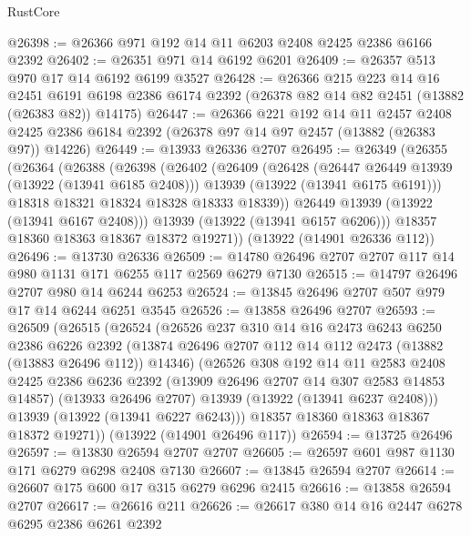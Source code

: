\begin{lexlean}{RustCore}
\begin{coremodule}
@26398 := @26366 @971 @192 @14 @11 @6203 @2408 @2425 @2386 @6166 @2392
@26402 := @26351 @971 @14 @6192 @6201
@26409 := @26357 @513 @970 @17 @14 @6192 @6199 @3527
@26428 := @26366
    @215
    @223
    @14
    @16
    @2451
    @6191
    @6198
    @2386
    @6174
    @2392
    (@26378 @82 @14 @82 @2451 (@13882 (@26383 @82)) @14175)
@26447 := @26366
    @221
    @192
    @14
    @11
    @2457
    @2408
    @2425
    @2386
    @6184
    @2392
    (@26378 @97 @14 @97 @2457 (@13882 (@26383 @97)) @14226)
@26449 := @13933 @26336 @2707
@26495 := @26349
    (@26355
      (@26364
        (@26388
          (@26398
            (@26402
              (@26409
                (@26428
                  (@26447 @26449 @13939 (@13922 (@13941 @6185 @2408)))
                  @13939
                  (@13922 (@13941 @6175 @6191)))
                @18318
                @18321
                @18324
                @18328
                @18333
                @18339))
            @26449
            @13939
            (@13922 (@13941 @6167 @2408)))
          @13939
          (@13922 (@13941 @6157 @6206)))
        @18357
        @18360
        @18363
        @18367
        @18372
        @19271))
    (@13922 (@14901 @26336 @112))
@26496 := @13730 @26336
@26509 := @14780 @26496 @2707 @2707 @117 @14 @980 @1131 @171 @6255 @117 @2569 @6279 @7130
@26515 := @14797 @26496 @2707 @980 @14 @6244 @6253
@26524 := @13845 @26496 @2707 @507 @979 @17 @14 @6244 @6251 @3545
@26526 := @13858 @26496 @2707
@26593 := @26509
    (@26515
      (@26524
        (@26526
          @237
          @310
          @14
          @16
          @2473
          @6243
          @6250
          @2386
          @6226
          @2392
          (@13874 @26496 @2707 @112 @14 @112 @2473 (@13882 (@13883 @26496 @112)) @14346)
          (@26526
            @308
            @192
            @14
            @11
            @2583
            @2408
            @2425
            @2386
            @6236
            @2392
            (@13909 @26496 @2707 @14 @307 @2583 @14853 @14857)
            (@13933 @26496 @2707)
            @13939
            (@13922 (@13941 @6237 @2408)))
          @13939
          (@13922 (@13941 @6227 @6243)))
        @18357
        @18360
        @18363
        @18367
        @18372
        @19271))
    (@13922 (@14901 @26496 @117))
@26594 := @13725 @26496
@26597 := @13830 @26594 @2707 @2707
@26605 := @26597 @601 @987 @1130 @171 @6279 @6298 @2408 @7130
@26607 := @13845 @26594 @2707
@26614 := @26607 @175 @600 @17 @315 @6279 @6296 @2415
@26616 := @13858 @26594 @2707
@26617 := @26616 @211
@26626 := @26617 @380 @14 @16 @2447 @6278 @6295 @2386 @6261 @2392

\end{coremodule}
\end{lexlean}
